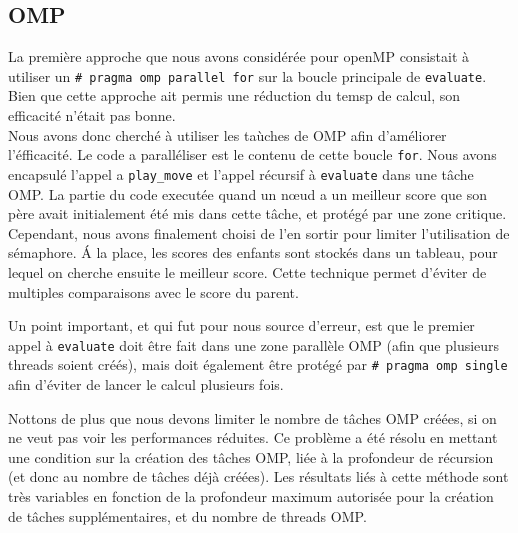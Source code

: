 \documentclass[12pt]{article}
\begin{document}
    \subsection{OMP}
    La première approche que nous avons considérée pour openMP consistait à utiliser
    un \texttt{\# pragma omp parallel for} sur la boucle principale de \texttt{evaluate}.
    Bien que cette approche ait permis une réduction du temsp de calcul, son efficacité
    n'était pas bonne.\\
    Nous avons donc cherché à utiliser les taùches de OMP afin d'améliorer l'éfficacité.
    Le code a paralléliser est le contenu de cette boucle \texttt{for}. Nous avons
    encapsulé l'appel a \texttt{play\_move} et l'appel récursif à \texttt{evaluate}
    dans une tâche OMP. La partie du code executée quand un n\oe ud a un meilleur
    score que son père avait initialement été mis dans cette tâche, et protégé par
    une zone critique. Cependant, nous avons finalement choisi de l'en sortir pour 
    limiter l'utilisation de sémaphore. \'A la place, les scores des enfants sont stockés
    dans un tableau, pour lequel on cherche ensuite le meilleur score. Cette technique
    permet d'éviter de multiples comparaisons avec le score du parent.\\
    \par Un point important, et qui fut pour nous source d'erreur, est que le premier
    appel à \texttt{evaluate} doit être fait dans une zone parallèle OMP (afin que plusieurs
    threads soient créés), mais doit également être protégé par \texttt{\# pragma omp single}
    afin d'éviter de lancer le calcul plusieurs fois.\\
    \par Nottons de plus que nous devons limiter le nombre de tâches OMP créées, si 
    on ne veut pas voir les performances réduites. Ce problème a été résolu en mettant
    une condition sur la création des tâches OMP, liée à la profondeur de récursion
    (et donc au nombre de tâches déjà créées). Les résultats liés à cette méthode
    sont très variables en fonction de la profondeur maximum autorisée pour la création
    de tâches supplémentaires, et du nombre de threads OMP.
\end{document}
